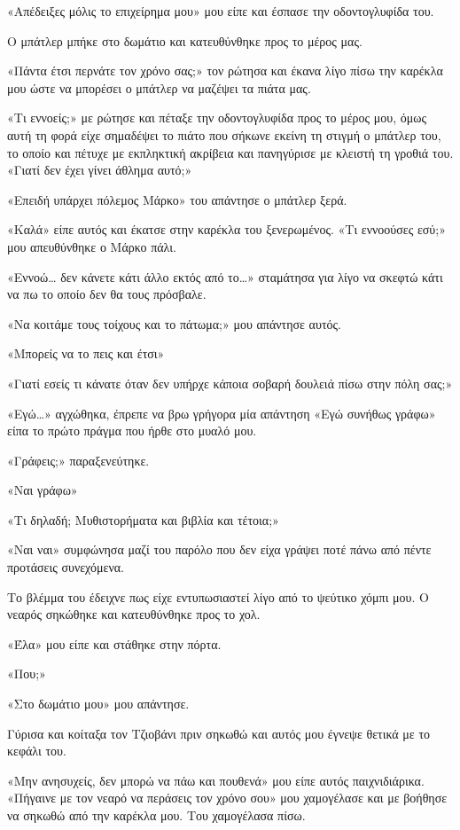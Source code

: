 \documentclass[12pt,twoside, openany]{book}
\begin{document}
«Απέδειξες μόλις το επιχείρημα μου» μου είπε και έσπασε την οδοντογλυφίδα του. 

Ο μπάτλερ μπήκε στο δωμάτιο και κατευθύνθηκε προς το μέρος μας.

«Πάντα έτσι περνάτε τον χρόνο σας;» τον ρώτησα και έκανα λίγο πίσω την καρέκλα μου ώστε να μπορέσει ο μπάτλερ να μαζέψει τα πιάτα μας.

«Τι εννοείς;» με ρώτησε και πέταξε την οδοντογλυφίδα προς το μέρος μου, όμως αυτή τη φορά είχε σημαδέψει το πιάτο που σήκωνε εκείνη τη στιγμή ο μπάτλερ του, το οποίο και πέτυχε με εκπληκτική ακρίβεια και πανηγύρισε με κλειστή τη γροθιά του. «Γιατί δεν έχει γίνει άθλημα αυτό;»

«Επειδή υπάρχει πόλεμος Μάρκο» του απάντησε ο μπάτλερ ξερά.

«Καλά» είπε αυτός και έκατσε στην καρέκλα του ξενερωμένος. «Τι εννοούσες εσύ;» μου απευθύνθηκε ο Μάρκο πάλι.

«Εννοώ… δεν κάνετε κάτι άλλο εκτός από το…» σταμάτησα για λίγο να σκεφτώ κάτι να πω το οποίο δεν θα τους πρόσβαλε.

«Να κοιτάμε τους τοίχους και το πάτωμα;» μου απάντησε αυτός.

«Μπορείς να το πεις και έτσι»

«Γιατί εσείς τι κάνατε όταν δεν υπήρχε κάποια σοβαρή δουλειά πίσω στην πόλη σας;»

«Εγώ…» αγχώθηκα, έπρεπε να βρω γρήγορα μία απάντηση «Εγώ συνήθως γράφω» είπα το πρώτο πράγμα που ήρθε στο μυαλό μου.

«Γράφεις;» παραξενεύτηκε.

«Ναι γράφω»

«Τι δηλαδή; Μυθιστορήματα και βιβλία και τέτοια;»

«Ναι ναι» συμφώνησα μαζί του παρόλο που δεν είχα γράψει ποτέ πάνω από πέντε προτάσεις συνεχόμενα.

Το βλέμμα του έδειχνε πως είχε εντυπωσιαστεί λίγο από το ψεύτικο χόμπι μου. Ο νεαρός σηκώθηκε και κατευθύνθηκε προς το χολ.

«Έλα» μου είπε και στάθηκε στην πόρτα.

«Που;»

«Στο δωμάτιο μου» μου απάντησε.

Γύρισα και κοίταξα τον Τζιοβάνι πριν σηκωθώ και αυτός μου έγνεψε θετικά με το κεφάλι του.

«Μην ανησυχείς, δεν μπορώ να πάω και πουθενά» μου είπε αυτός παιχνιδιάρικα. «Πήγαινε με τον νεαρό να περάσεις τον χρόνο σου» μου χαμογέλασε και με βοήθησε να σηκωθώ από την καρέκλα μου. Του χαμογέλασα πίσω. 
\end{document}
